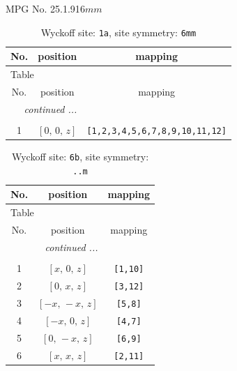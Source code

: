 \documentclass[fleqn,8pt]{jsarticle}
\begin{document}
\setcounter{MaxMatrixCols}{32}

\renewcommand{\tablename}{Table~}
\renewcommand{\figurename}{Figure~}
\begin{center}
\LARGE
MPG No. 25.1.91\quad$6mm$
\end{center}
\renewcommand{\arraystretch}{1.2}
\begin{longtable}{ccc}
\caption{Wyckoff site: {\tt 1a}, site symmetry: {\tt 6mm}}
 \\
 \hline \hline
No. & position & mapping \\ \hline \endfirsthead

\multicolumn{2}{l}{\tablename\ \thetable{}} \\
 \hline \hline
No. & position & mapping \\ \hline \endhead

 \hline \hline
\multicolumn{2}{r}{\footnotesize\it continued ...} \\ \endfoot

 \hline \hline
\multicolumn{2}{r}{} \\ \endlastfoot

1 & $\left[ 0,\, 0,\, z \right]$ & {\tt [1,2,3,4,5,6,7,8,9,10,11,12]} \\
\end{longtable}
\renewcommand{\arraystretch}{1.2}
\begin{longtable}{ccc}
\caption{Wyckoff site: {\tt 6b}, site symmetry: {\tt ..m}}
 \\
 \hline \hline
No. & position & mapping \\ \hline \endfirsthead

\multicolumn{2}{l}{\tablename\ \thetable{}} \\
 \hline \hline
No. & position & mapping \\ \hline \endhead

 \hline \hline
\multicolumn{2}{r}{\footnotesize\it continued ...} \\ \endfoot

 \hline \hline
\multicolumn{2}{r}{} \\ \endlastfoot

1 & $\left[ x,\, 0,\, z \right]$ & {\tt [1,10]} \\ \hline
2 & $\left[ 0,\, x,\, z \right]$ & {\tt [3,12]} \\ \hline
3 & $\left[ - x,\, - x,\, z \right]$ & {\tt [5,8]} \\ \hline
4 & $\left[ - x,\, 0,\, z \right]$ & {\tt [4,7]} \\ \hline
5 & $\left[ 0,\, - x,\, z \right]$ & {\tt [6,9]} \\ \hline
6 & $\left[ x,\, x,\, z \right]$ & {\tt [2,11]} \\
\end{longtable}
\end{document}
